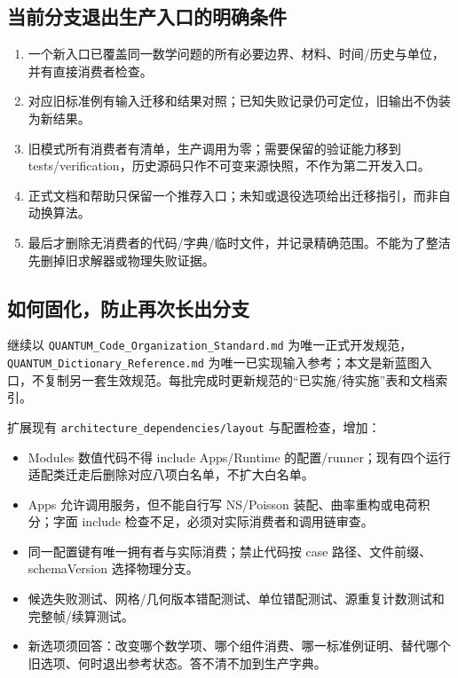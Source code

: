 \documentclass[UTF8,a4paper,11pt,fontset=fandol]{ctexart}
\numberwithin{equation}{section}
\newcommand{\code}[1]{\nolinkurl{#1}}
\begin{document}
\subsection{当前分支退出生产入口的明确条件}
\begin{enumerate}
\item 一个新入口已覆盖同一数学问题的所有必要边界、材料、时间/历史与单位，并有直接消费者检查。
\item 对应旧标准例有输入迁移和结果对照；已知失败记录仍可定位，旧输出不伪装为新结果。
\item 旧模式所有消费者有清单，生产调用为零；需要保留的验证能力移到 tests/verification，历史源码只作不可变来源快照，不作为第二开发入口。
\item 正式文档和帮助只保留一个推荐入口；未知或退役选项给出迁移指引，而非自动换算法。
\item 最后才删除无消费者的代码/字典/临时文件，并记录精确范围。不能为了整洁先删掉旧求解器或物理失败证据。
\end{enumerate}

\subsection{如何固化，防止再次长出分支}
继续以 \code{QUANTUM_Code_Organization_Standard.md} 为唯一正式开发规范，\code{QUANTUM_Dictionary_Reference.md} 为唯一已实现输入参考；本文是新蓝图入口，不复制另一套生效规范。每批完成时更新规范的“已实施/待实施”表和文档索引。

扩展现有 \code{architecture_dependencies/layout} 与配置检查，增加：
\begin{itemize}
\item Modules 数值代码不得 include Apps/Runtime 的配置/runner；现有四个运行适配类迁走后删除对应八项白名单，不扩大白名单。
\item Apps 允许调用服务，但不能自行写 NS/Poisson 装配、曲率重构或电荷积分；字面 include 检查不足，必须对实际消费者和调用链审查。
\item 同一配置键有唯一拥有者与实际消费；禁止代码按 case 路径、文件前缀、schemaVersion 选择物理分支。
\item 候选失败测试、网格/几何版本错配测试、单位错配测试、源重复计数测试和完整帧/续算测试。
\item 新选项须回答：改变哪个数学项、哪个组件消费、哪一标准例证明、替代哪个旧选项、何时退出参考状态。答不清不加到生产字典。
\end{itemize}
\end{document}
